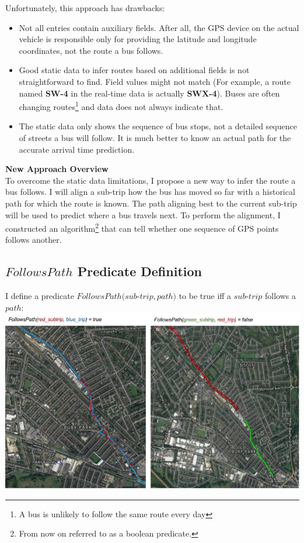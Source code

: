 \documentclass[12pt,a4paper,oneside,openright]{report}
\begin{document}
Unfortunately, this approach has drawbacks:

\begin{itemize}
\item Not all entries contain auxiliary fields. After all, the GPS device on the
actual vehicle is responsible only for providing the latitude and longitude
coordinates, not the route a bus follows.

\item Good static data to infer routes based on additional fields is not 
straightforward to find. Field values might not match
(For example, a route named \textbf{SW-4} in the real-time data is actually
\textbf{SWX-4}).
Buses are often changing routes\footnote{A bus is unlikely to follow the same route
every day} and data does not always indicate that.

\item The static data only shows the sequence of bus stops, not a detailed
sequence of streets a bus will follow. It is much better to know an actual
path for the accurate arrival time prediction.
\end{itemize}

\textbf{New Approach Overview} \\

To overcome the static data limitations, I propose a new way to infer the
route a bus follows. I will align a sub-trip how the bus has moved
so far with a historical path for which the route is known. The path aligning
best to the current sub-trip will be used to predict where a bus travels next.
To perform the alignment, I constructed an algorithm\footnote{From now on referred
to as a boolean predicate.} that can tell whether one sequence of GPS points 
follows another.

\subsection{$FollowsPath$ Predicate Definition}

I define a predicate $FollowsPath(sub$-$trip, path)$ to be true iff a $sub$-$trip$
follows a $path$: \\

\includegraphics[width=\textwidth, scale=1.2]{figs/follows_path.jpg} \\
\end{document}
